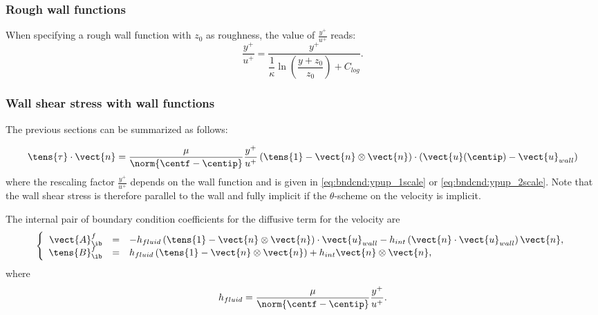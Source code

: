 \subsubsection{Rough wall functions}\label{sec:bndcnd:2velocityscales}
When specifying a rough wall function with $z_0$ as roughness, the value of $\frac{y^+}{u^+}$ reads:
\begin{equation}\label{eq:bndcnd:ypup_rough}
\dfrac{y^+}{u^+} = \dfrac{y^+}{ \dfrac{1}{\kappa} \ln \left( \dfrac{y+z_0}{z_0}\right) + C_{log}}.
\end{equation}



\subsubsection{Wall shear stress with wall functions}
The previous sections can be summarized as follows:

\begin{equation}
  \tens{\tau} \cdot \vect{n} = \dfrac{\mu}{\norm{\centf - \centip} } \dfrac{y^+}{u^+} \left(\tens{1} - \vect{n} \otimes \vect{n} \right) \cdot \left(\vect{u}(\centip) - \vect{u}_{wall} \right)
\end{equation}
%
where the rescaling factor $\frac{y^+}{u^+}$ depends on the wall function and is given in \eqref{eq:bndcnd:ypup_1scale} or \eqref{eq:bndcnd:ypup_2scale}. Note that the wall shear stress is therefore parallel to the wall and fully implicit if the $\theta$-scheme on the velocity is implicit.

The internal pair of boundary condition coefficients for the diffusive term for the velocity are
\begin{equation}\label{eq:bndcnd:boundary_condition_wall_function}
\left\lbrace
\begin{array}{r c l}
\vect{A}^f_\ib & = & -h_{fluid}  \left(\tens{1} - \vect{n} \otimes \vect{n} \right) \cdot  \vect{u}_{wall}
 - h_{int} \left( \vect{n} \cdot \vect{u}_{wall}  \right) \vect{n}
, \\
\tens{B}^f_\ib & = & h_{fluid}  \left(\tens{1} - \vect{n} \otimes \vect{n} \right)
+ h_{int} \vect{n} \otimes \vect{n}
,
\end{array}
\right.
\end{equation}
where
\begin{equation}
h_{fluid} = \dfrac{\mu}{\norm{\centf - \centip} } \dfrac{y^+}{u^+}.
\end{equation}

